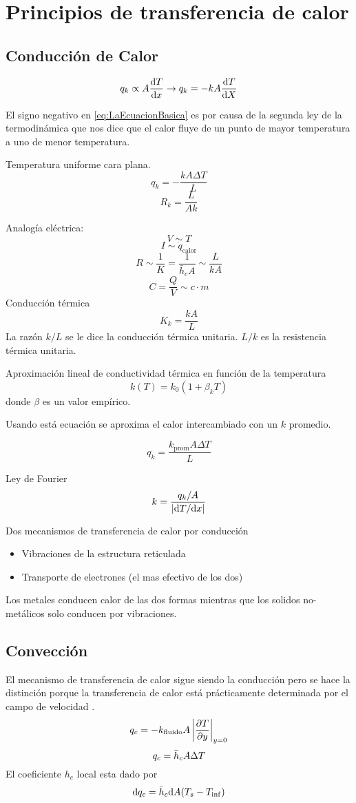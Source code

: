 
\section{Principios de transferencia de calor}
\subsection{Conducción de Calor}
\begin{equation} \label{eq:LaEcuacionBasica}
    q_k\propto A\frac{\textrm{d} T}{\textrm{d} x}\rightarrow q_k=-kA\frac{\textrm{d} T}{\textrm{d} X}
\end{equation}

El signo negativo en \ref{eq:LaEcuacionBasica} es por causa de la segunda ley de la termodinámica que nos dice que el calor fluye de un punto de mayor temperatura a uno de menor temperatura.

Temperatura uniforme cara plana.
$$q_k=-\frac{kA\Delta T}{L} $$
$$R_k=\frac{L}{Ak}$$

Analogía eléctrica:
$$V\sim T $$
$$I \sim \dot{q}_{\text{calor}}$$
$$R\sim\frac{1}{K}= \frac{1}{\bar{h}_cA}\sim \frac{L}{kA} $$
$$C=\frac{Q}{V}\sim c\cdot m \si{}$$
Conducción térmica
$$K_k=\frac{kA}{L}$$
La razón $k/L$ se le dice la conducción térmica unitaria. $L/k$ es la  resistencia térmica unitaria.

Aproximación lineal de conductividad térmica en función de la temperatura
$$k(T)=k_0(1+\beta_kT)$$ donde $\beta$ es un valor empírico.

Usando está ecuación se aproxima el calor intercambiado con un $k$ promedio.

$$q_k=\frac{k_{\textrm{prom}}A\Delta T}{L}$$

Ley de Fourier
$$ k=\frac{q_k/A}{|\textrm{d} T/\textrm{d} x|}$$

Dos mecanismos de transferencia de calor por conducción
\begin{itemize}
    \item Vibraciones de la estructura reticulada
    \item Transporte de electrones (el mas efectivo de los dos)
\end{itemize}
Los metales conducen calor de las dos formas mientras que los solidos no-metálicos solo conducen por vibraciones.
\subsection{Convección}
El mecanismo de transferencia de calor sigue siendo la conducción pero se hace la distinción porque la transferencia de calor está prácticamente determinada por el campo de
velocidad . 
$$q_c=-k_{\textrm{fluido}}A\left| \frac{\partial T}{\partial y}\right|_{y=0} $$
$$q_c=\bar{h}_c A\Delta T $$
El coeficiente $h_c$ local esta dado por
$$ \textrm{d} q_c=\bar{h}_c \textrm{d} A(T_s-T_{\inf}) $$

